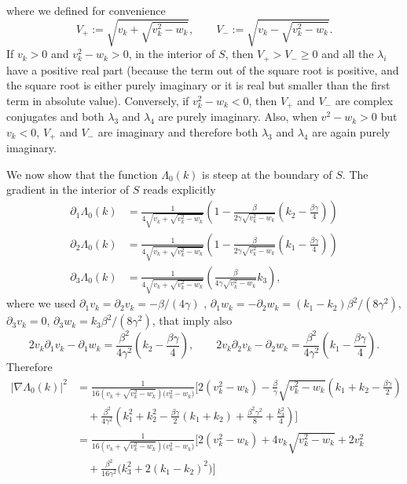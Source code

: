 \documentclass[a4paper,11pt]{article}
\numberwithin{equation}{section}
\begin{document}
where we defined for convenience 
\begin{equation}
    V_+ := \sqrt{  v_k + \sqrt{v_k^2 - w_k}}, \qquad V_- := \sqrt{  v_k - \sqrt{v_k^2 - w_k}} .
\end{equation}
If $v_k > 0$ and $v_k^2 - w_k > 0$, in the interior of $S$, then $V_+ > V_- \geq 0$ and all the $\lambda_i$ have a positive real part (because the term out of the square root is positive, and the square root is either purely imaginary or it is real but smaller than the first term in absolute value). Conversely, if $v_k^2 - w_k <0$, then $V_+$ and $V_-$ are complex conjugates and both $\lambda_3$ and $\lambda_4$ are purely imaginary. Also, when $v^2-w_k>0$ but $v_k <0$, $V_+$ and $V_-$ are imaginary and therefore both $\lambda_3$ and $\lambda_4$ are again purely imaginary.

We now show that the function $\Lambda_0(k)$ is steep at the boundary of $S$. The gradient in the interior of $S$ reads explicitly
\begin{align}
    \partial_1 \Lambda_0(k) &= \frac{1}{4\sqrt{  v_k + \sqrt{v_k^2 - w_k}}}  \left( 1 - \frac{\beta}{2\gamma\sqrt{v_k^2 - w_k}} \left( k_2 - \frac{\beta \gamma}{4} \right) \right) \label{eq:partial1}\\
    \partial_2 \Lambda_0(k) &= \frac{1}{4\sqrt{  v_k + \sqrt{v_k^2 - w_k}}}  \left( 1- \frac{\beta}{2\gamma\sqrt{v_k^2 - w_k}} \left( k_1 - \frac{\beta \gamma}{4} \right) \right) \label{eq:partial2}\\
    \partial_3 \Lambda_0(k) &=\frac{1}{4\sqrt{  v_k + \sqrt{v_k^2 - w_k}}}  \left( \frac{\beta}{4\gamma \sqrt{v_k^2 - w_k}}  k_3   \right), \label{eq:partial3}
\end{align}
where we used $\partial_1 v_k= \partial_2 v_k = -\beta/(4\gamma)$ , $\partial_1 w_k = - \partial_2 w_k = (k_1-k_2)\beta^2/(8\gamma^2)$, $\partial_3 v_k=0$, $\partial_3 w_k = k_3 \beta^2/(8\gamma^2)$, that imply also $$2v_k \partial_1 v_k - \partial_1 w_k= \frac{\beta^2}{4\gamma^2}\left( k_2 - \frac{\beta\gamma}{4} \right), \qquad 2v_k \partial_2 v_k - \partial_2 w_k= \frac{\beta^2}{4\gamma^2}\left( k_1 - \frac{\beta\gamma}{4} \right) .$$
Therefore
\begin{align}
    \big|\nabla \Lambda_0(k)\big|^2 &= \frac{1}{16\left(v_k + \sqrt{v_k^2 - w_k} \right)\Big( v_k^2 -w_k \Big)}\Bigg[ 2(v_k^2 -w_k ) - \frac{\beta}{\gamma}\sqrt{v_k^2 - w_k} \left( k_1+ k_2 - \frac{\beta\gamma}{2} \right) \nonumber \\
    &\quad + \frac{\beta^2}{4\gamma^2}\left( k_1^2 +k_2^2 -\frac{\beta\gamma}{2}(k_1+k_2) + \frac{\beta^2\gamma^2}{8} + \frac{k_3^2}{4} \right)\Bigg] \nonumber \\
    &= \frac{1}{16\left(v_k + \sqrt{v_k^2 - w_k} \right)\Big( v_k^2 -w_k \Big)}\Bigg[ 2(v_k^2 -w_k ) + 4 v_k \sqrt{v_k^2 - w_k} + 2 v_k^2 \nonumber \\
    &\quad +\frac{\beta^2}{16\gamma^2}\Big(k_3^2 + 2(k_1-k_2)^2\Big) \Bigg]
\end{align}
\end{document}
